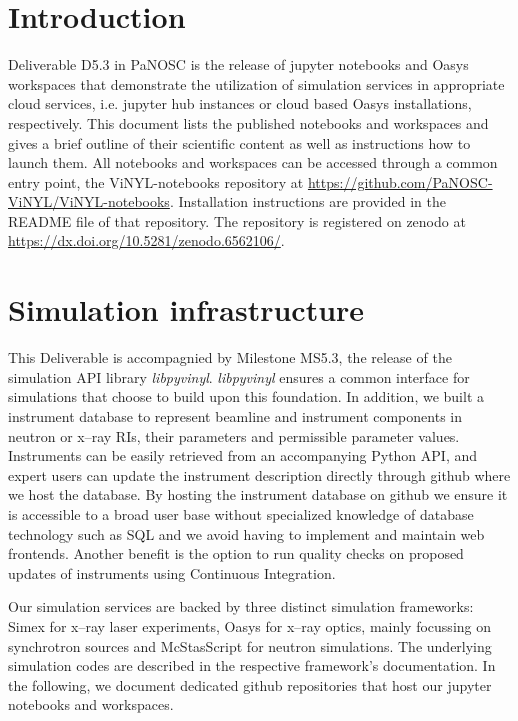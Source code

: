 \documentclass[11pt, a4paper]{article}
\begin{document}
\newpage
{}
\newpage
\tableofcontents
\newpage


\section{Introduction}
\label{sec:introduction}
Deliverable D5.3 in PaNOSC is the release of jupyter notebooks and Oasys
workspaces
that demonstrate the utilization of simulation services in appropriate cloud
services, i.e. jupyter hub instances or cloud based Oasys installations,
respectively. This document lists the published notebooks and workspaces and
gives a brief outline of their scientific content as well as instructions how to
launch them. All notebooks and workspaces can be accessed through a common entry
point, the ViNYL-notebooks repository at
\url{https://github.com/PaNOSC-ViNYL/ViNYL-notebooks}. Installation instructions
are provided in the README file of that repository. The repository is registered
on zenodo at \url{https://dx.doi.org/10.5281/zenodo.6562106/}.

\section{Simulation infrastructure}
\label{sec:simulation_infrastructure}
This Deliverable is accompagnied by Milestone MS5.3, the release of the
simulation API library \textit{libpyvinyl}. \textit{libpyvinyl}
ensures a common interface for
simulations that choose to build upon this foundation. In addition, we built
a instrument database to represent beamline and instrument components in neutron
or x--ray RIs, their parameters and permissible parameter values.
Instruments can be easily retrieved from an
accompanying Python API, and expert users can update the instrument description
directly through github where we host the database. By hosting the instrument
database on github we ensure it is accessible to a broad user base without
specialized knowledge of database technology such as SQL and we avoid having to
implement and maintain web frontends. Another benefit is the
option to run quality checks on proposed updates of instruments using
Continuous Integration.

Our simulation services are backed by three distinct simulation frameworks:
Simex for x--ray laser experiments, Oasys for x--ray optics, mainly focussing on
synchrotron sources and McStasScript for neutron simulations. The underlying
simulation codes are described in the respective framework's documentation. In
the following, we document dedicated github repositories that host our jupyter
notebooks and workspaces.
\end{document}
